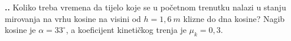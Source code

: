 

\noindent 
\textbf{
\thecjelina.\thezadatak.}
Koliko treba vremena da tijelo koje se u početnom trenutku nalazi u stanju mirovanja na vrhu kosine na visini od  $h=1,6\ m$ klizne do dna kosine? Nagib kosine je $\alpha=33^\circ$, a koeficijent kinetičkog trenja je $\mu_k=0,3$.




